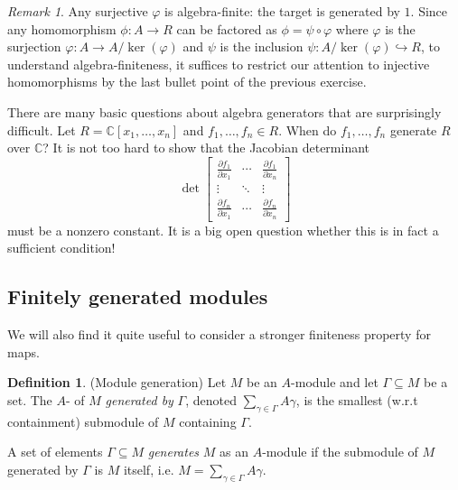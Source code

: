 \documentclass{amsart}[12pt]
\def\ker{\operatorname{ker}}
\newcommand{\C}{\mathbb{C}}
\numberwithin{equation}{section}
\theoremstyle{plain} %
\theoremstyle{definition}
\newtheorem{defn}[equation]{Definition}
\theoremstyle{remark}
\newtheorem{rem}[equation]{Remark}
\newcommand{\ssec}[1]{\subsection{#1}}
\begin{document}
\begin{rem}
Any surjective $\varphi$ is algebra-finite: the target is generated by $1$. Since any homomorphism $\phi:A\to R$ can be factored as $\phi=\psi\circ \varphi$ where $\varphi$ is the surjection $\varphi:A\to A/\ker (\varphi)$ and $\psi$ is the inclusion $\psi:A/\ker (\varphi) \hookrightarrow R$, to understand algebra-finiteness, it suffices to restrict our attention to injective homomorphisms by the last bullet point of the previous exercise.
\end{rem}


There are many basic questions about algebra generators that are surprisingly difficult. Let $R=\C[x_1,\dots,x_n]$ and $f_1,\dots,f_n\in R$. When do $f_1,\dots,f_n$ generate $R$ over $\C$? It is not too hard to show that the Jacobian determinant
\[ \det \begin{bmatrix} \frac{\partial f_1}{\partial x_1} & \cdots & \frac{\partial f_1}{\partial x_n} \\ \vdots & \ddots & \vdots \\
\frac{\partial f_n}{\partial x_1} & \cdots & \frac{\partial f_n}{\partial x_n} \end{bmatrix}\]
must be a nonzero constant. It is a big open question whether this is in fact a sufficient condition!




\ssec{Finitely generated modules}

We will also find it quite useful to consider a stronger finiteness property for maps. 


\begin{defn}(Module generation)
Let $M$ be an $A$-module and let $\Gamma \subseteq M$ be a set. The $A$- of $M$ {\em generated by} $\Gamma$, denoted $\sum_{\gamma \in \Gamma} A \gamma$, is the smallest (w.r.t containment) submodule of $M$ containing $\Gamma$.

A set of elements $\Gamma \subseteq M$ \emph{generates} $M$ as an $A$-module if the submodule of $M$ generated by $\Gamma$ is $M$ itself, i.e. $M=\sum_{\gamma \in \Gamma} A \gamma$.
\end{defn}
\end{document}
